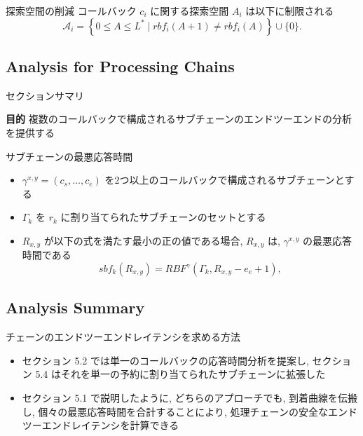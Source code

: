 \begin{frame}{探索空間の削減}
    コールバック $c_i$ に関する探索空間 $A_i$ は以下に制限される
    \begin{equation*}
        \mathcal{A}_{i}=\left\{0 \leq A \leq L^{*} \mid r b f_{i}(A+1) \neq r b f_{i}(A)\right\} \cup\{0\} .
    \end{equation*}
\end{frame}


\subsection{Analysis for Processing Chains}
\label{ssec: analysis for processing chains}

\begin{frame}{セクションサマリ}
    \begin{itembox}[l]{\textbf{目的}}
        複数のコールバックで構成されるサブチェーンのエンドツーエンドの分析を提供する
    \end{itembox}
\end{frame}

\begin{frame}[label=lemma8]{サブチェーンの最悪応答時間}
    \begin{lemma}[サブチェーンの最悪応答時間]
        \begin{itemize}
            \item $\gamma^{x, y}=\left(c_{s}, \ldots, c_{e}\right)$ を2つ以上のコールバックで構成されるサブチェーンとする
            \item $\Gamma_{k}$ を $r_{k}$ に割り当てられたサブチェーンのセットとする
            \item $R_{x, y}$ が以下の式を満たす最小の正の値である場合, $R_{x, y}$ は, $\gamma^{x, y}$ の最悪応答時間である
                  \begin{equation*}
                      s b f_{k}\left(R_{x, y}\right)=R B F^{\gamma}\left(\Gamma_{k}, R_{x, y}-e_{e}+1\right),
                  \end{equation*}
        \end{itemize}
    \end{lemma}
\end{frame}


\subsection{Analysis Summary}
\label{ssec: analysis summary}

\begin{frame}{チェーンのエンドツーエンドレイテンシを求める方法}
    \begin{itemize}
        \item セクション 5.2 では単一のコールバックの応答時間分析を提案し, セクション 5.4 はそれを単一の予約に割り当てられたサブチェーンに拡張した
        \item セクション 5.1 で説明したように, どちらのアプローチでも, 到着曲線を伝搬し, 個々の最悪応答時間を合計することにより, 処理チェーンの安全なエンドツーエンドレイテンシを計算できる
    \end{itemize}
\end{frame}
